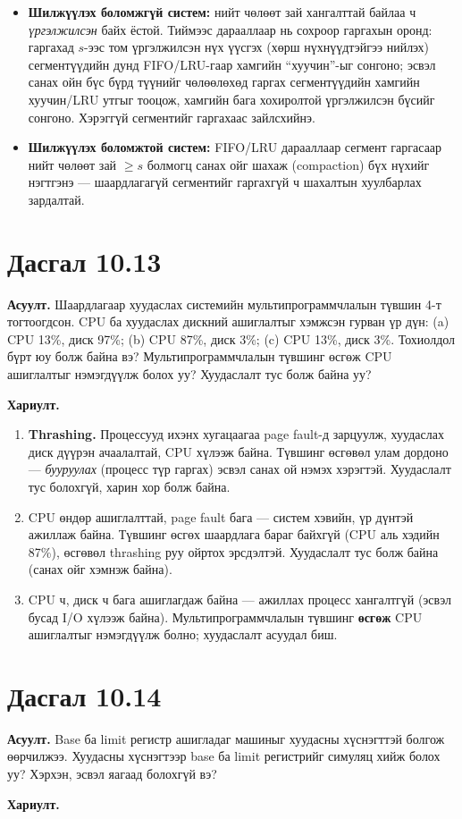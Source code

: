 \documentclass[12pt,a4paper]{article}
\newcommand{\question}[2]{\section{Дасгал #1}\textbf{Асуулт.} #2\par\medskip\textbf{Хариулт.}\par}
\begin{document}
\begin{itemize}[leftmargin=1.5em]
  \item \textbf{Шилжүүлэх боломжгүй систем:} нийт чөлөөт зай хангалттай байлаа ч \emph{үргэлжилсэн} байх ёстой. Тиймээс дарааллаар нь сохроор гаргахын оронд: гаргахад $s$-ээс том үргэлжилсэн нүх үүсгэх (хөрш нүхнүүдтэйгээ нийлэх) сегментүүдийн дунд FIFO/LRU-гаар хамгийн “хуучин”-ыг сонгоно; эсвэл санах ойн бүс бүрд түүнийг чөлөөлөхөд гаргах сегментүүдийн хамгийн хуучин/LRU утгыг тооцож, хамгийн бага хохиролтой үргэлжилсэн бүсийг сонгоно. Хэрэггүй сегментийг гаргахаас зайлсхийнэ.
  \item \textbf{Шилжүүлэх боломжтой систем:} FIFO/LRU дарааллаар сегмент гаргасаар нийт чөлөөт зай $\ge s$ болмогц санах ойг шахаж (compaction) бүх нүхийг нэгтгэнэ — шаардлагагүй сегментийг гаргахгүй ч шахалтын хуулбарлах зардалтай.
\end{itemize}

\question{10.13}{Шаардлагаар хуудаслах системийн мультипрограммчлалын түвшин 4-т тогтоогдсон. CPU ба хуудаслах дискний ашиглалтыг хэмжсэн гурван үр дүн: (a) CPU 13\%, диск 97\%; (b) CPU 87\%, диск 3\%; (c) CPU 13\%, диск 3\%. Тохиолдол бүрт юу болж байна вэ? Мультипрограммчлалын түвшинг өсгөж CPU ашиглалтыг нэмэгдүүлж болох уу? Хуудаслалт тус болж байна уу?}

\begin{enumerate}[label=(\alph*), leftmargin=1.5em]
  \item \textbf{Thrashing.} Процессууд ихэнх хугацаагаа page fault-д зарцуулж, хуудаслах диск дүүрэн ачаалалтай, CPU хүлээж байна. Түвшинг өсгөвөл улам дордоно — \emph{бууруулах} (процесс түр гаргах) эсвэл санах ой нэмэх хэрэгтэй. Хуудаслалт тус болохгүй, харин хор болж байна.
  \item CPU өндөр ашиглалттай, page fault бага — систем хэвийн, үр дүнтэй ажиллаж байна. Түвшинг өсгөх шаардлага бараг байхгүй (CPU аль хэдийн 87\%), өсгөвөл thrashing руу ойртох эрсдэлтэй. Хуудаслалт тус болж байна (санах ойг хэмнэж байна).
  \item CPU ч, диск ч бага ашиглагдаж байна — ажиллах процесс хангалтгүй (эсвэл бусад I/O хүлээж байна). Мультипрограммчлалын түвшинг \textbf{өсгөж} CPU ашиглалтыг нэмэгдүүлж болно; хуудаслалт асуудал биш.
\end{enumerate}

\question{10.14}{Base ба limit регистр ашигладаг машиныг хуудасны хүснэгттэй болгож өөрчилжээ. Хуудасны хүснэгтээр base ба limit регистрийг симуляц хийж болох уу? Хэрхэн, эсвэл яагаад болохгүй вэ?}
\end{document}
